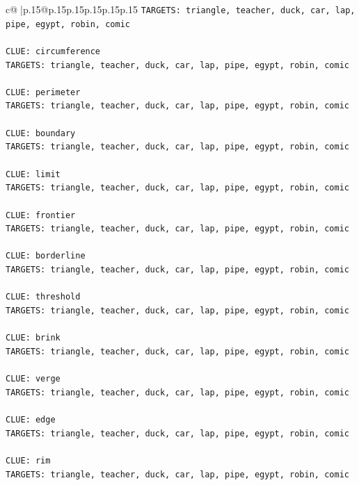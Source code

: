 \documentclass{article}
\begin{document}
{\begin{supertabular}{c@{$\;$}|p{.15\linewidth}@{}p{.15\linewidth}p{.15\linewidth}p{.15\linewidth}p{.15\linewidth}p{.15\linewidth}}
{{{\texttt{TARGETS: triangle, teacher, duck, car, lap, pipe, egypt, robin, comic} \\
\\ 
\texttt{CLUE: circumference} \\
\texttt{TARGETS: triangle, teacher, duck, car, lap, pipe, egypt, robin, comic} \\
\\ 
\texttt{CLUE: perimeter} \\
\texttt{TARGETS: triangle, teacher, duck, car, lap, pipe, egypt, robin, comic} \\
\\ 
\texttt{CLUE: boundary} \\
\texttt{TARGETS: triangle, teacher, duck, car, lap, pipe, egypt, robin, comic} \\
\\ 
\texttt{CLUE: limit} \\
\texttt{TARGETS: triangle, teacher, duck, car, lap, pipe, egypt, robin, comic} \\
\\ 
\texttt{CLUE: frontier} \\
\texttt{TARGETS: triangle, teacher, duck, car, lap, pipe, egypt, robin, comic} \\
\\ 
\texttt{CLUE: borderline} \\
\texttt{TARGETS: triangle, teacher, duck, car, lap, pipe, egypt, robin, comic} \\
\\ 
\texttt{CLUE: threshold} \\
\texttt{TARGETS: triangle, teacher, duck, car, lap, pipe, egypt, robin, comic} \\
\\ 
\texttt{CLUE: brink} \\
\texttt{TARGETS: triangle, teacher, duck, car, lap, pipe, egypt, robin, comic} \\
\\ 
\texttt{CLUE: verge} \\
\texttt{TARGETS: triangle, teacher, duck, car, lap, pipe, egypt, robin, comic} \\
\\ 
\texttt{CLUE: edge} \\
\texttt{TARGETS: triangle, teacher, duck, car, lap, pipe, egypt, robin, comic} \\
\\ 
\texttt{CLUE: rim} \\
\texttt{TARGETS: triangle, teacher, duck, car, lap, pipe, egypt, robin, comic} \\
}}}
\end{supertabular}}
\end{document}
